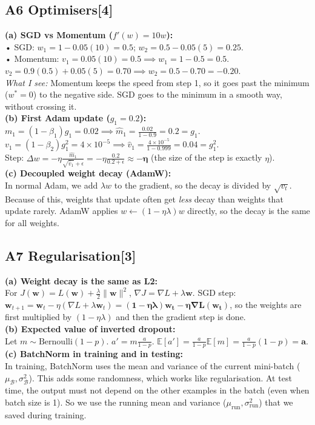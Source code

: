 \documentclass[conference,a4paper]{IEEEtran}
\newcommand{\task}[2]{\subsection{#1\hfill[#2]}}
\begin{document}
\task{A6 Optimisers}{4}
\textbf{(a) SGD vs Momentum ($f'(w)=10w$):}\\
• SGD: $w_1 = 1 - 0.05(10) = \mathbf{0.5}$; $w_2 = 0.5 - 0.05(5) = \mathbf{0.25}$.\\
• Momentum: $v_1 = 0.05(10) = 0.5 \implies w_1 = 1 - 0.5 = \mathbf{0.5}$.
$v_2 = 0.9(0.5) + 0.05(5) = 0.70 \implies w_2 = 0.5 - 0.70 = \mathbf{-0.20}$.\\
\emph{What I see:} Momentum keeps the speed from step 1, so it goes past the minimum ($w^*=0$) to the negative side. SGD goes to the minimum in a smooth way, without crossing it.\\[2pt]
\textbf{(b) First Adam update ($g_1=0.2$):}\\
$m_1 = (1-\beta_1)g_1 = 0.02 \implies \hat m_1 = \frac{0.02}{1-0.9} = 0.2 = g_1$.\\
$v_1 = (1-\beta_2)g_1^2 = 4\times 10^{-5} \implies \hat v_1 = \frac{4\times 10^{-5}}{1-0.999} = 0.04 = g_1^2$.\\
Step: $\Delta w = -\eta \frac{\hat m_1}{\sqrt{\hat v_1}+\epsilon} = -\eta \frac{0.2}{0.2+\epsilon} \approx \mathbf{-\eta}$ (the size of the step is exactly $\eta$).\\[2pt]
\textbf{(c) Decoupled weight decay (AdamW):}\\
In normal Adam, we add $\lambda w$ to the gradient, so the decay is divided by $\sqrt{v_t}$. Because of this, weights that update often get \emph{less} decay than weights that update rarely. AdamW applies $w \leftarrow (1-\eta\lambda)w$ directly, so the decay is the same for all weights.

\task{A7 Regularisation}{3}
\textbf{(a) Weight decay is the same as L2:}\\
For $J(\mathbf{w}) = L(\mathbf{w}) + \frac{\lambda}{2}\|\mathbf{w}\|^2$, $\nabla J = \nabla L + \lambda\mathbf{w}$.
SGD step: $\mathbf{w}_{t+1} = \mathbf{w}_t - \eta(\nabla L + \lambda\mathbf{w}_t) = \mathbf{(1-\eta\lambda)\mathbf{w}_t - \eta\nabla L(\mathbf{w}_t)}$, so the weights are first multiplied by $(1-\eta\lambda)$ and then the gradient step is done.\\[2pt]
\textbf{(b) Expected value of inverted dropout:}\\
Let $m\sim\text{Bernoulli}(1-p)$. $a' = m \frac{a}{1-p}$.
$\mathbb{E}[a'] = \frac{a}{1-p}\mathbb{E}[m] = \frac{a}{1-p}(1-p) = \mathbf{a}$.\\[2pt]
\textbf{(c) BatchNorm in training and in testing:}\\
In training, BatchNorm uses the mean and variance of the current mini-batch ($\mu_{\mathcal{B}}, \sigma_{\mathcal{B}}^2$). This adds some randomness, which works like regularisation. At test time, the output must not depend on the other examples in the batch (even when batch size is 1). So we use the running mean and variance ($\mu_{\text{run}}, \sigma^2_{\text{run}}$) that we saved during training.
\end{document}
